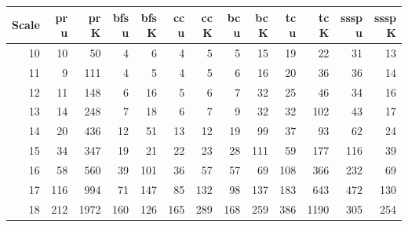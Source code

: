 \begin{tabular}{rrrrrrrrrrrrr}
\toprule
Scale & pr u & pr K & bfs u & bfs K & cc u & cc K & bc u & bc K & tc u & tc K & sssp u & sssp K \\
\midrule
10 & 10 & 50 & 4 & 6 & 4 & 5 & 5 & 15 & 19 & 22 & 31 & 13 \\
11 & 9 & 111 & 4 & 5 & 4 & 5 & 6 & 16 & 20 & 36 & 36 & 14 \\
12 & 11 & 148 & 6 & 16 & 5 & 6 & 7 & 32 & 25 & 46 & 34 & 16 \\
13 & 14 & 248 & 7 & 18 & 6 & 7 & 9 & 32 & 32 & 102 & 43 & 17 \\
14 & 20 & 436 & 12 & 51 & 13 & 12 & 19 & 99 & 37 & 93 & 62 & 24 \\
15 & 34 & 347 & 19 & 21 & 22 & 23 & 28 & 111 & 59 & 177 & 116 & 39 \\
16 & 58 & 560 & 39 & 101 & 36 & 57 & 57 & 69 & 108 & 366 & 232 & 69 \\
17 & 116 & 994 & 71 & 147 & 85 & 132 & 98 & 137 & 183 & 643 & 472 & 130 \\
18 & 212 & 1972 & 160 & 126 & 165 & 289 & 168 & 259 & 386 & 1190 & 305 & 254 \\
\bottomrule
\end{tabular}
